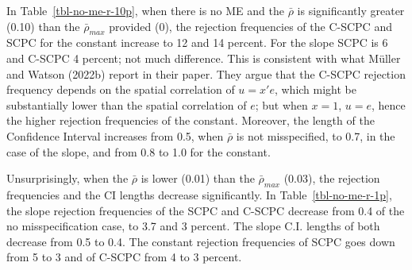 \documentclass[
]{article}
\begin{document}
In Table~\ref{tbl-no-me-r-10p}, when there is no ME and the \(\bar\rho\)
is significantly greater (0.10) than the \(\bar\rho_{max}\) provided
(0), the rejection frequencies of the C-SCPC and SCPC for the constant
increase to 12 and 14 percent. For the slope SCPC is 6 and C-SCPC 4
percent; not much difference. This is consistent with what Müller and
Watson (2022b) report in their paper. They argue that the C-SCPC
rejection frequency depends on the spatial correlation of \(u=x'e\),
which might be substantially lower than the spatial correlation of
\(e\); but when \(x=1\), \(u=e\), hence the higher rejection frequencies
of the constant. Moreover, the length of the Confidence Interval
increases from 0.5, when \(\bar\rho\) is not misspecified, to 0.7, in
the case of the slope, and from 0.8 to 1.0 for the constant.

Unsurprisingly, when the \(\bar\rho\) is lower (0.01) than the
\(\bar\rho_{max}\) (0.03), the rejection frequencies and the CI lengths
decrease significantly. In Table~\ref{tbl-no-me-r-1p}, the slope
rejection frequencies of the SCPC and C-SCPC decrease from 0.4 of the no
misspecification case, to 3.7 and 3 percent. The slope C.I. lengths of
both decrease from 0.5 to 0.4. The constant rejection frequencies of
SCPC goes down from 5 to 3 and of C-SCPC from 4 to 3 percent.
\end{document}
